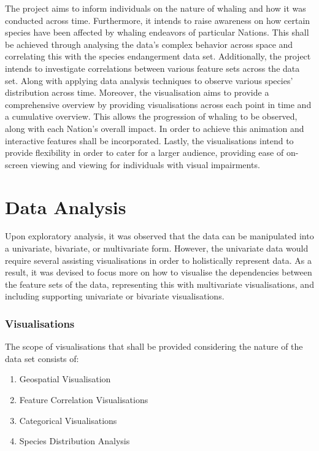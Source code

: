 \documentclass[12pt,a4paper]{article}
\begin{document}
    The project aims to inform individuals on the nature of whaling and how it was conducted across time. Furthermore, it intends to  raise awareness on how certain species have been affected by whaling endeavors of particular Nations. This shall be achieved through analysing the data's complex behavior across space and correlating this with the species endangerment data set. Additionally, the project intends to investigate correlations between various feature sets across the data set. 
    Along with applying data analysis techniques to observe various species' distribution across time.  Moreover, the visualisation aims to provide a comprehensive overview by providing visualisations across each point in time and a cumulative overview. This allows the progression of whaling to be observed, along with each Nation's overall impact. In order to achieve this animation and interactive features shall be incorporated. Lastly, the visualisations intend to provide flexibility in order to cater for a larger audience, providing ease of on-screen viewing and viewing for individuals with visual impairments. 
    

\section{Data Analysis}
Upon exploratory analysis, it was observed that the data can be manipulated into a univariate, bivariate, or multivariate form. However, the univariate data would require several assisting visualisations in order to holistically represent data. As a result, it was devised to focus more on how to visualise the dependencies between the feature sets of the data, representing this with multivariate visualisations, and including supporting univariate or bivariate visualisations. 

 \subsubsection{Visualisations}
    The scope of visualisations that shall be provided considering the nature of the data set consists of: 
\begin{enumerate}
  \item Geospatial Visualisation \\
  \item Feature Correlation Visualisations\\
  \item Categorical Visualisations\\
  \item Species Distribution Analysis
\end{enumerate}
  
\end{document}
